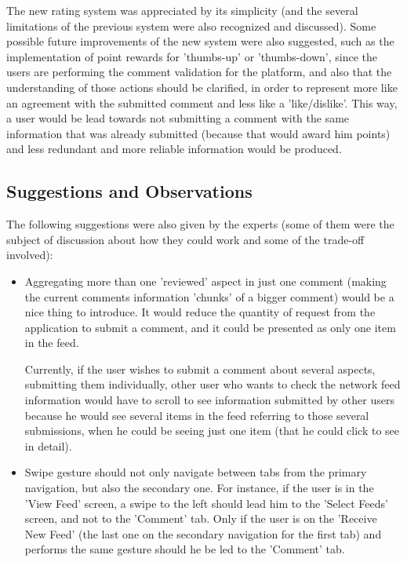 The new rating system was appreciated by its simplicity (and the several limitations of the previous system were also recognized and discussed). Some possible future improvements of the new system were also suggested, such as the implementation of point rewards for 'thumbs-up' or 'thumbs-down', since the users are performing the comment validation for the platform, and also that the understanding of those actions should be clarified, in order to represent more like an agreement with the submitted comment and less like a 'like/dislike'. This way, a user would be lead towards not submitting a comment with the same information that was already submitted (because that would award him points) and less redundant and more reliable information would be produced.

\subsection{Suggestions and Observations}

The following suggestions were also given by the experts (some of them were the subject of discussion about how they could work and some of the trade-off involved):

\begin{itemize}
\item Aggregating more than one 'reviewed' aspect in just one comment (making the current comments information 'chunks' of a bigger comment) would be a nice thing to introduce. It would reduce the quantity of request from the application to submit a comment, and it could be presented as only one item in the feed. 

Currently, if the user wishes to submit a comment about several aspects, submitting them individually, other user who wants to check the network feed information would have to scroll to see information submitted by other users because he would see several items in the feed referring to those several submissions, when he could be seeing just one item (that he could click to see in detail).

\item Swipe gesture should not only navigate between tabs from the primary navigation, but also the secondary one. For instance, if the user is in the 'View Feed' screen, a swipe to the left should lead him to the 'Select Feeds' screen, and not to the 'Comment' tab. Only if the user is on the 'Receive New Feed' (the last one on the secondary navigation for the first tab) and performs the same gesture should he be led to the 'Comment' tab.
\end{itemize}

